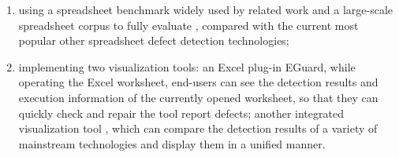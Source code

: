 \begin{englishabstract}
\begin{enumerate}
    \item using a spreadsheet benchmark widely used by related work and a large-scale spreadsheet corpus to fully evaluate \wa , compared with the current most popular other spreadsheet defect detection technologies;
    
    \item implementing two visualization tools: an Excel plug-in EGuard, while operating the Excel worksheet, end-users can see the detection results and execution information of the currently opened worksheet, so that they can quickly check and repair the tool report defects; another integrated visualization tool \sg, which can compare the detection results of a variety of mainstream technologies and display them in a unified manner.
\end{enumerate}


\end{englishabstract}